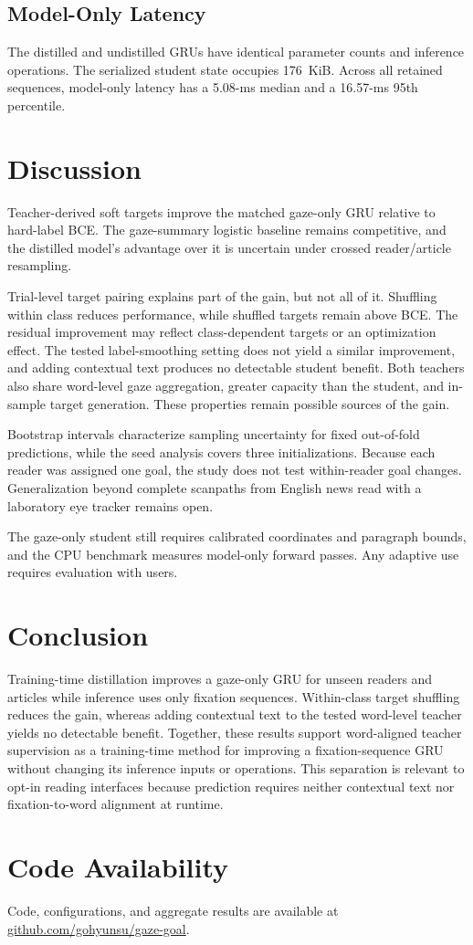 \documentclass[conference,letterpaper]{IEEEtran}
\begin{document}
\subsection{Model-Only Latency}

The distilled and undistilled GRUs have identical parameter counts and
inference operations.  The serialized student state occupies 176~KiB.  Across
all retained sequences, model-only latency has a 5.08-ms median and a 16.57-ms
95th percentile.

\section{Discussion}

Teacher-derived soft targets improve the matched gaze-only GRU relative to
hard-label BCE.  The gaze-summary logistic baseline remains competitive, and
the distilled model's advantage over it is uncertain under crossed
reader/article resampling.

Trial-level target pairing explains part of the gain, but not all of it.
Shuffling within class reduces performance, while shuffled targets remain above
BCE.  The residual improvement may reflect class-dependent targets or an
optimization effect.  The tested label-smoothing setting does not yield a
similar improvement, and adding contextual text produces no detectable student
benefit.  Both teachers also share word-level gaze aggregation, greater
capacity than the student, and in-sample target generation.  These properties
remain possible sources of the gain.

Bootstrap intervals characterize sampling uncertainty for fixed out-of-fold
predictions, while the seed analysis covers three initializations.  Because
each reader was assigned one goal, the study does not test within-reader goal
changes.  Generalization beyond complete scanpaths from English news read with
a laboratory eye tracker remains open.

The gaze-only student still requires calibrated coordinates and paragraph
bounds, and the CPU benchmark measures model-only forward passes.  Any
adaptive use requires evaluation with users.

\section{Conclusion}

Training-time distillation improves a gaze-only GRU for unseen readers and
articles while inference uses only fixation sequences.  Within-class target
shuffling reduces the gain, whereas adding contextual text to the tested
word-level teacher yields no detectable benefit.  Together, these results
support word-aligned teacher supervision as a training-time method for
improving a fixation-sequence GRU without changing its inference inputs or
operations.  This separation is relevant to opt-in reading interfaces because
prediction requires neither contextual text nor fixation-to-word alignment at
runtime.

\section*{Code Availability}

{\raggedright
Code, configurations, and aggregate results are available at
\url{github.com/gohyunsu/gaze-goal}.
\par}



\end{document}
